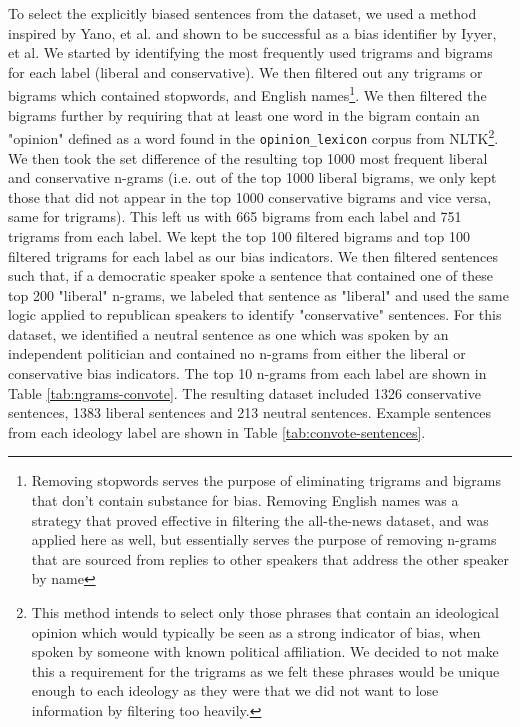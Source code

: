 \documentclass[10pt,a4paper,onecolumn]{article}
\begin{document}
To select the explicitly biased sentences from the dataset, we used a method inspired by Yano, et al. \cite{YanoBigrams} and shown to be successful as a bias identifier by Iyyer, et al. We started by identifying the most frequently used trigrams and bigrams for each label (liberal and conservative). We then filtered out any trigrams or bigrams which contained stopwords, and English names\footnote{Removing stopwords serves the purpose of eliminating trigrams and bigrams that don't contain substance for bias. Removing English names was a strategy that proved effective in filtering the all-the-news dataset, and was applied here as well, but essentially serves the purpose of removing n-grams that are sourced from replies to other speakers that address the other speaker by name}. We then filtered the bigrams further by requiring that at least one word in the bigram contain an "opinion" defined as a word found in the \texttt{opinion\_lexicon} corpus from NLTK\footnote{This method intends to select only those phrases that contain an ideological opinion which would typically be seen as a strong indicator of bias, when spoken by someone with known political affiliation. We decided to not make this a requirement for the trigrams as we felt these phrases would be unique enough to each ideology as they were that we did not want to lose information by filtering too heavily.}. We then took the set difference of the resulting top 1000 most frequent liberal and conservative n-grams (i.e. out of the top 1000 liberal bigrams, we only kept those that did not appear in the top 1000 conservative bigrams and vice versa, same for trigrams). This left us with 665 bigrams from each label and 751 trigrams from each label. We kept the top 100 filtered bigrams and top 100 filtered trigrams for each label as our bias indicators. We then filtered sentences such that, if a democratic speaker spoke a sentence that contained one of these top 200 "liberal" n-grams, we labeled that sentence as "liberal" and used the same logic applied to republican speakers to identify "conservative" sentences. For this dataset, we identified a neutral sentence as one which was spoken by an independent politician and contained no n-grams from either the liberal or conservative bias indicators. The top 10 n-grams from each label are shown in Table \ref{tab:ngrams-convote}. The resulting dataset included 1326 conservative sentences, 1383 liberal sentences and 213 neutral sentences. Example sentences from each ideology label are shown in Table \ref{tab:convote-sentences}.
\end{document}
